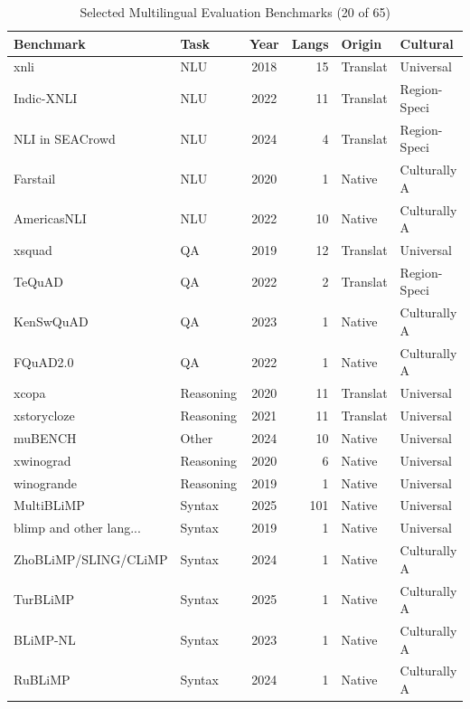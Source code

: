 \begin{table}[t]
\centering
\caption{Selected Multilingual Evaluation Benchmarks (20 of 65)}
\label{tab:catalog}
\small
\begin{tabular}{@{}llcrll@{}}
\toprule
\textbf{Benchmark} & \textbf{Task} & \textbf{Year} & \textbf{Langs} & \textbf{Origin} & \textbf{Cultural} \\
\midrule
xnli & NLU & 2018 & 15 & Translat & Universal \\
Indic-XNLI & NLU & 2022 & 11 & Translat & Region-Speci \\
NLI in SEACrowd & NLU & 2024 & 4 & Translat & Region-Speci \\
Farstail & NLU & 2020 & 1 & Native & Culturally A \\
AmericasNLI & NLU & 2022 & 10 & Native & Culturally A \\
xsquad & QA & 2019 & 12 & Translat & Universal \\
TeQuAD & QA & 2022 & 2 & Translat & Region-Speci \\
KenSwQuAD & QA & 2023 & 1 & Native & Culturally A \\
FQuAD2.0 & QA & 2022 & 1 & Native & Culturally A \\
xcopa & Reasoning & 2020 & 11 & Translat & Universal \\
xstorycloze & Reasoning & 2021 & 11 & Translat & Universal \\
muBENCH & Other & 2024 & 10 & Native & Universal \\
xwinograd & Reasoning & 2020 & 6 & Native & Universal \\
winogrande & Reasoning & 2019 & 1 & Native & Universal \\
MultiBLiMP & Syntax & 2025 & 101 & Native & Universal \\
blimp and other lang... & Syntax & 2019 & 1 & Native & Universal \\
ZhoBLiMP/SLING/CLiMP & Syntax & 2024 & 1 & Native & Culturally A \\
TurBLiMP & Syntax & 2025 & 1 & Native & Culturally A \\
BLiMP-NL & Syntax & 2023 & 1 & Native & Culturally A \\
RuBLiMP & Syntax & 2024 & 1 & Native & Culturally A \\
\bottomrule
\end{tabular}
\end{table}

